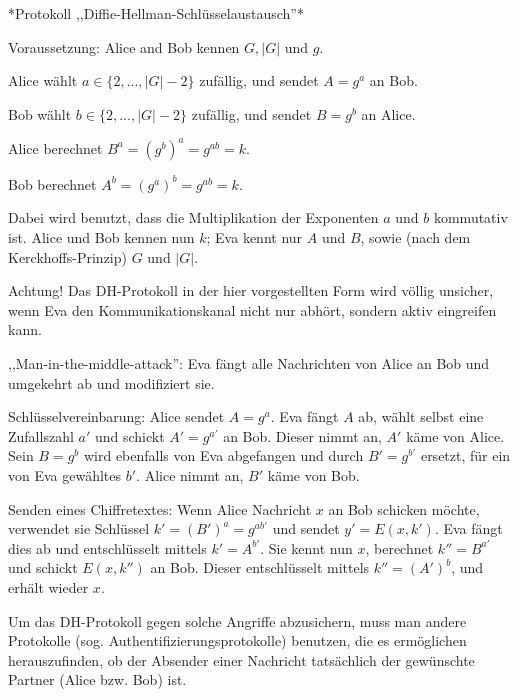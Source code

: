 \documentclass[a4paper]{article}
\begin{document}
\begin{multicols}{3}
        *Protokoll ,,Diffie-Hellman-Schlüsselaustausch''*
        \begin{itemize*}
            \item Voraussetzung: Alice and Bob kennen $G,|G|$ und $g$.
        \end{itemize*}
        \begin{enumerate*}
            \item  Alice wählt $a\in\{2 ,...,|G|- 2\}$ zufällig, und sendet $A=g^a$ an Bob.
            \item  Bob wählt $b\in\{2 ,...,|G|-2\}$ zufällig, und sendet $B=g^b$ an Alice.
            \item  Alice berechnet $B^a= (g^b)^a=g^{ab}=k$.
            \item  Bob berechnet $A^b= (g^a)^b=g^{ab}=k$.
        \end{enumerate*}

        Dabei wird benutzt, dass die Multiplikation der Exponenten $a$ und $b$ kommutativ ist. Alice und Bob kennen nun $k$; Eva kennt nur $A$ und $B$, sowie (nach dem Kerckhoffs-Prinzip) $G$ und $|G|$.

        Achtung! Das DH-Protokoll in der hier vorgestellten Form wird völlig unsicher, wenn Eva den Kommunikationskanal nicht nur abhört, sondern aktiv eingreifen kann.

        ,,Man-in-the-middle-attack'': Eva fängt alle Nachrichten von Alice an Bob und umgekehrt ab und modifiziert sie.

        Schlüsselvereinbarung: Alice sendet $A=g^a$. Eva fängt $A$ ab, wählt selbst eine Zufallszahl $a'$ und schickt $A'=g^{a'}$ an Bob. Dieser nimmt an, $A'$ käme von Alice. Sein $B=g^b$ wird ebenfalls von Eva abgefangen und durch $B'=g^{b'}$ ersetzt, für ein von Eva gewähltes $b'$. Alice nimmt an, $B'$ käme von Bob.

        Senden eines Chiffretextes: Wenn Alice Nachricht $x$ an Bob schicken möchte, verwendet sie Schlüssel $k'= (B')^a=g^{ab'}$ und sendet $y'=E(x,k')$. Eva fängt dies ab und entschlüsselt mittels $k'=A^{b'}$. Sie kennt nun $x$, berechnet $k''=B^{a'}$ und schickt $E(x,k'')$ an Bob. Dieser entschlüsselt mittels $k''= (A')^b$, und erhält wieder $x$.

        Um das DH-Protokoll gegen solche Angriffe abzusichern, muss man andere Protokolle (sog. Authentifizierungsprotokolle) benutzen, die es ermöglichen herauszufinden, ob der Absender einer Nachricht tatsächlich der gewünschte Partner (Alice bzw. Bob) ist.


\end{multicols}
\end{document}
